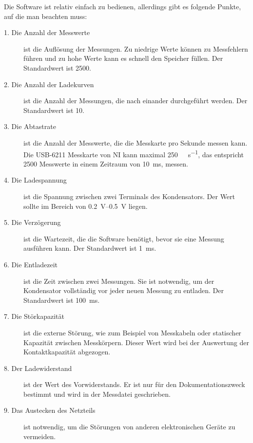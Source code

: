 Die Software ist relativ einfach zu bedienen, allerdings gibt es folgende Punkte, auf die man beachten muss:
\begin{description}
    \item[1. Die Anzahl der Messwerte] ist die Auflösung der Messungen.
        Zu niedrige Werte können zu Messfehlern führen und zu hohe Werte kann es schnell den Speicher füllen.
        Der Standardwert ist \num{2500}.

    \item[2. Die Anzahl der Ladekurven] ist die Anzahl der Messungen, die nach einander durchgeführt werden.
        Der Standardwert ist \num{10}.

    \item[3. Die Abtastrate] ist die Anzahl der Messwerte, die die Messkarte pro Sekunde messen kann.
        Die USB-6211 Messkarte von NI kann maximal \SI[per-mode=symbol]{250}{\kilo\sample\per\second}, das entspricht \num{2500} Messwerte in einem Zeitraum von \SI{10}{\milli\second}, messen.

    \item[4. Die Ladespannung] ist die Spannung zwischen zwei Terminals des Kondensators.
        Der Wert sollte im Bereich von \SIrange{0.2}{0.5}{\volt} liegen.

    \item[5. Die Verzögerung] ist die Wartezeit, die die Software benötigt, bevor sie eine Messung ausführen kann.
        Der Standardwert ist \SI{1}{\ms}.

    \item[6. Die Entladezeit] ist die Zeit zwischen zwei Messungen.
        Sie ist notwendig, um der Kondensator vollständig vor jeder neuen Messung zu entladen.
        Der Standardwert ist \SI{100}{\ms}.

    \item[7. Die Störkapazität] ist die externe Störung, wie zum Beispiel von Messkabeln oder statischer Kapazität zwischen Messkörpern.
        Dieser Wert wird bei der Auswertung der Kontaktkapazität abgezogen.

    \item[8. Der Ladewiderstand] ist der Wert des Vorwiderstands.
        Er ist nur für den Dokumentationszweck bestimmt und wird in der Messdatei geschrieben.

    \item[9. Das Austecken des Netzteils] ist notwendig, um die Störungen von anderen elektronischen Geräte zu vermeiden.
\end{description}

